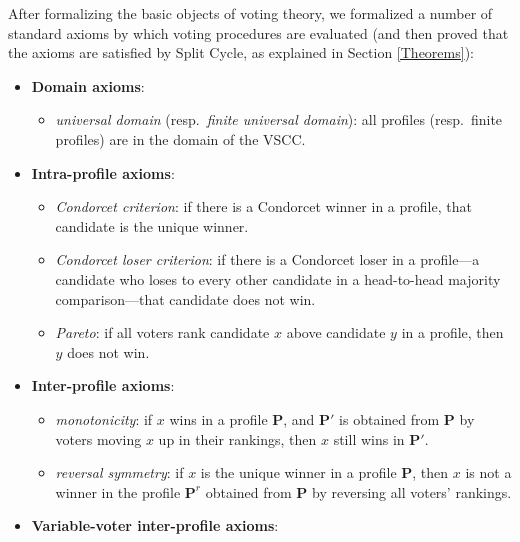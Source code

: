 \documentclass[runningheads]{llncs}
\begin{document}
After formalizing the basic objects of voting theory, we  formalized a number of standard axioms by which voting procedures are evaluated (and then proved that the axioms are satisfied by Split Cycle, as explained in Section \ref{Theorems}):
\begin{itemize}
\item[] \textbf{Domain axioms}:
\begin{itemize}
\item \textit{universal domain} (resp.~\textit{finite universal domain}): all profiles (resp.~finite profiles) are in the domain of the VSCC.\\
\end{itemize}
\item[] \textbf{Intra-profile axioms}:
\begin{itemize}
\item \textit{Condorcet criterion}: if there is a Condorcet winner in a profile, that candidate is the unique winner.
\item \textit{Condorcet loser criterion}: if there is a Condorcet loser in a profile---a candidate who loses to every other candidate in a head-to-head majority comparison---that candidate does not win.
\item \textit{Pareto}: if all voters rank candidate $x$ above candidate $y$ in a profile, then $y$ does not win.\\
\end{itemize}
\item[] \textbf{Inter-profile axioms}:
\begin{itemize}
\item \textit{monotonicity}: if $x$ wins in a profile $\mathbf{P}$, and $\mathbf{P}'$ is obtained from $\mathbf{P}$ by voters moving $x$ up in their rankings, then $x$ still wins in $\mathbf{P}'$.
\item \textit{reversal symmetry}: if $x$ is the unique winner in a profile $\mathbf{P}$, then $x$ is not a winner in the profile $\mathbf{P}^r$ obtained from $\mathbf{P}$ by reversing all voters' rankings.\\
\end{itemize}
\item[] \textbf{Variable-voter inter-profile axioms}:
\begin{itemize}

\end{itemize}
\end{itemize}
\end{document}
